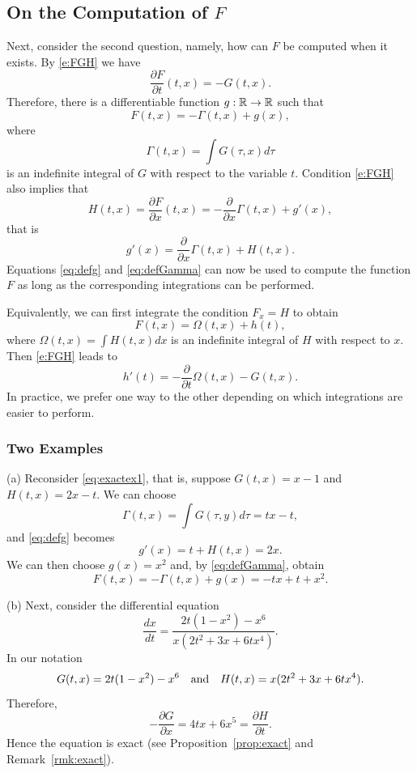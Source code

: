 \documentclass{ximera}
\begin{document}
\subsection*{On the Computation of $F$}
Next, consider the second question, namely, how can $F$ be
computed when it exists.  By \eqref{e:FGH} we have
\[
\frac{\partial F}{\partial t}(t,x) = -G(t,x).
\]
Therefore, there is a differentiable function $g:\mbox{$\mathbb{R}$}\to\mbox{$\mathbb{R}$}$ such
that
\begin{equation}  \label{eq:defGamma}
F(t,x) = -\Gamma(t,x) + g(x),
\end{equation}
where 
\[
\Gamma(t,x)=\int G(\tau,x) d\tau
\]
is an indefinite integral of $G$ with respect to the variable $t$.
Condition \eqref{e:FGH} also implies that
\[
H(t,x) = \frac{\partial F}{\partial x}(t,x) =
-\frac{\partial}{\partial x}\Gamma(t,x) + g'(x),
\]
that is
\begin{equation} \label{eq:defg}
g'(x) = \frac{\partial}{\partial x}\Gamma(t,x) + H(t,x).
\end{equation}
Equations \eqref{eq:defg} and \eqref{eq:defGamma} can now be used 
to compute the function $F$ as long as the corresponding
integrations can be performed.  

Equivalently, we can first integrate the condition $F_x=H$ to obtain
\begin{equation}  \label{eq:excond}
F(t,x) = \Omega(t,x) + h(t),
\end{equation}
where $\Omega(t,x)=\int H(t,x)dx$ is an indefinite integral of $H$ with
respect to $x$.  Then \eqref{e:FGH} leads to
\[
h'(t) = -\frac{\partial}{\partial t}\Omega(t,x) - G(t,x).
\]
In practice, we prefer one way to the other depending on which
integrations are easier to perform.

\subsubsection*{Two Examples}

\noindent (a) Reconsider \eqref{eq:exactex1}, that is, suppose $G(t,x)=x-1$ and 
$H(t,x)=2x-t$.  We can choose
\[
\Gamma(t,x)=\int G(\tau,y)d\tau = tx-t,
\]
and \eqref{eq:defg} becomes
\[
g'(x) = t + H(t,x) = 2x.
\]
We can then choose $g(x)=x^2$ and, by \eqref{eq:defGamma}, obtain
\[
F(t,x) = -\Gamma(t,x) + g(x) = -tx + t + x^2.
\]

\noindent (b) Next, consider the differential equation
\begin{equation}  \label{eq:exacex2}
\frac{dx}{dt} = \frac{2t(1-x^2)-x^6}{x(2t^2+3x+6tx^4)}.
\end{equation}
In our notation
\[
G(t,x) = 2t(1-x^2)-x^6 \quad\mbox{and}\quad H(t,x) = x(2t^2+3x+6tx^4).
\]
Therefore, 
\[
-\frac{\partial G}{\partial x} = 4tx + 6x^5 = 
\frac{\partial H}{\partial t}.
\]
Hence the equation is exact (see Proposition~\ref{prop:exact} and 
Remark~\ref{rmk:exact}).  
\end{document}
